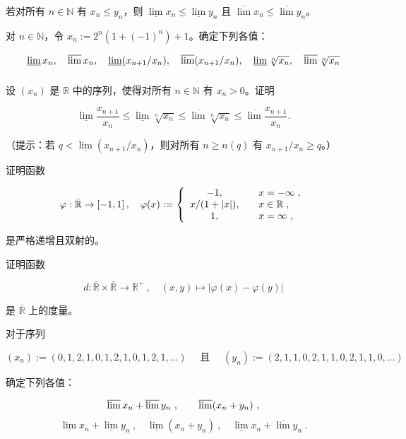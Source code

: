 \begin{exercises}
\begin{items}
若对所有 $ n \in \mathbb{N} $ 有 $ x_n \leq y_n $，则 $ \underline{\lim} x_n \leq \underline{\lim} y_n $ 且 $ \overline{\lim} x_n \leq \overline{\lim} y_n $。

\end{items}

\item

对 $n \in \mathbb{N}$，令 $x_n := 2^n \left(1 + (-1)^n\right) + 1$。确定下列各值：

\[
\varliminf_{}x_{n},\quad\varlimsup_{}x_{n},\quad\varliminf_{}(x_{n+1}/x_{n}),\quad\varlimsup_{}(x_{n+1}/x_{n}),\quad\varliminf_{}\sqrt[n]{x_{n}},\quad\varlimsup_{}\sqrt[n]{x_{n}}
\]
\item

设 $ (x_n) $ 是 $ \mathbb{R} $ 中的序列，使得对所有 $ n \in \mathbb{N} $ 有 $ x_n > 0 $。证明

\[
\underline{\lim}\frac{x_{n+1}}{x_{n}}\leq\underline{\lim}\sqrt[n]{x_{n}}\leq\overline{\lim}\sqrt[n]{x_{n}}\leq\overline{\lim}\frac{x_{n+1}}{x_{n}}.
\]

（提示：若 $ q < \underline{\lim}(x_{n+1}/x_n) $，则对所有 $ n \geq n(q) $ 有 $ x_{n+1}/x_n \geq q $。）

\item

\begin{items}
\item

证明函数

\begin{equation*}
\varphi:\bar{\mathbb{R}}\to\left[-1,1\right],\quad\varphi(x):=\left\{\begin{array}{c l}{-1,}&{\quad x=-\infty\;,}\\ {x/(1+|x|),}&{\quad x\in\mathbb{R}\;,}\\ {1,}&{\quad x=\infty\;,}\\ \end{array}\right.
\end{equation*}

是严格递增且双射的。

\item

证明函数

\[
d\colon\bar{\mathbb{R}}\times\bar{\mathbb{R}}\to\mathbb{R}^{+}~,\quad(x,y)\mapsto|\varphi(x)-\varphi(y)|
\]

是 $ \bar{\mathbb{R}} $ 上的度量。

\end{items}

\item

对于序列

\[
(x_{n}):=(0,1,2,1,0,1,2,1,0,1,2,1,\ldots)\quad\text{ 且 }\quad(y_{n}):=(2,1,1,0,2,1,1,0,2,1,1,0,\ldots)
\]

确定下列各值：

\[
\varlimsup x_{n}+\varlimsup y_{n}\ ,\qquad \varlimsup(x_{n}+y_{n})\ ,
\]
\[
\underline{{\operatorname*{l i m}}}x_{n}+\underline{{\operatorname*{l i m}}}y_{n}~,\quad\underline{{\operatorname*{l i m}}}(x_{n}+y_{n})~,\quad\underline{{\operatorname*{l i m}}}x_{n}+\overline{{\operatorname*{l i m}}}y_{n}~.
\]
\end{exercises}

